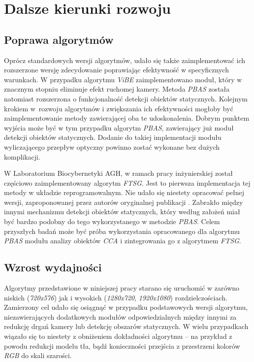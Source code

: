 \chapter{Dalsze kierunki rozwoju}
\label{cha:kierunki_rozwoju}

\section{Poprawa algorytmów}
\label{sec:poprawa_algorytmow}

Oprócz standardowych wersji algorytmów, udało się także zaimplementować ich rozszerzone wersję zdecydowanie poprawiając efektywność w specyficznych warunkach. W przypadku algorytmu \textit{ViBE} zaimplementowano moduł, który w znacznym stopniu eliminuje efekt ruchomej kamery. Metoda \textit{PBAS} została natomiast rozszerzona o funkcjonalność detekcji obiektów statycznych. Kolejnym krokiem w~rozwoju algorytmów i zwiększania ich efektywności mogłoby być zaimplementowanie metody zawierającej oba te udoskonalenia. Dobrym punktem wyjścia może być w tym przypadku algorytm \textit{PBAS}, zawierający już moduł detekcji obiektów statycznych. Dodanie do takiej implementacji modułu wyliczającego przepływ optyczny powinno zostać wykonane bez dużych komplikacji. 

W Laboratorium Biocybernetyki AGH, w ramach pracy inżynierskiej \cite{janus_15} został częściowo zaimplementowany algorytm \textit{FTSG}. 
Jest to pierwsza implementacja tej metody w układzie reprogramowalnym. 
Nie udało się niestety opracować pełnej wersji, zaproponowanej przez autorów oryginalnej publikacji \cite{wang_14}. 
Zabrakło między innymi mechanizmu detekcji obiektów statycznych, który według założeń miał być bardzo podobny do tego wykorzystanego w metodzie \textit{PBAS}. 
Celem przyszłych badań może być próba wykorzystania opracowanego dla algorytmu \textit{PBAS} modułu analizy obiektów \textit{CCA} i zintegrowania go z algorytmem \textit{FTSG}. 

\section{Wzrost wydajności}
\label{sec:wzrost_wydajnosci}

Algorytmy przedstawione w niniejszej pracy starano się uruchomić w zarówno niskich (\textit{720x576}) jak i wysokich (\textit{1280x720}, \textit{1920x1080}) rozdzielczościach. 
Zamierzony cel udało się osiągnąć w przypadku podstawowych wersji algorytmu, niezawierających dodatkowych modułów odpowiedzialnych między innymi za redukcję drgań kamery lub detekcję obszarów statycznych. 
W wielu przypadkach wiązało się to niestety z obniżeniem dokładności algorytmu -- na przykład z powodu redukcji modelu tła, bądź konieczności przejścia z przestrzeni kolorów \textit{RGB} do skali szarości. 

